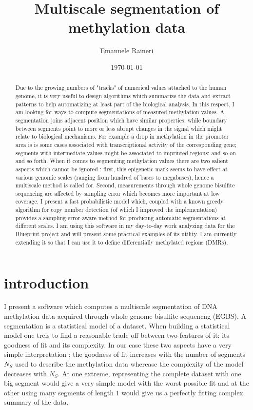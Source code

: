 \documentclass[11pt]{amsart}
\begin{document}
\title{Multiscale segmentation of methylation data}
\author{Emanuele Raineri}
\date{\today}
\maketitle

\begin{abstract}
Due to the growing numbers of "tracks" of numerical values attached to the human genome,
it is very useful to design algorithms which summarize the data
and extract patterns to help automatizing at least part of the
biological analysis. In this respect, I am looking for ways to compute 
segmentations of  measured methylation values. A segmentation joins adjacent position
which have similar properties, while boundary between segments point to more or less abrupt changes
in the signal which might relate to biological mechanisms. For example
a drop in methylation in the promoter area is is some cases associated with 
transcriptional activity of the corresponding gene; 
segments with intermediate values might be associated to imprinted regions; and so on and so forth.
When it comes to segmenting methylation values there are two salient aspects which cannot be ignored : first, this epigenetic mark seems to have effect at various genomic scales (ranging from hundred of bases to megabases), hence a multiscale method is called for. Second, measurements through whole genome bisulfite sequencing are affected by sampling error which becomes more important at low coverage.
I present a fast probabilistic model which, coupled with a known greedy algorithm for copy number detection (of which I improved the implementation) provides a sampling-error-aware method for producing automatic segmentations at different scales.
I am using this software in my day-to-day work analyzing data for the Blueprint project and will present some practical examples of its utility. 
I am currently extending it so that I can use it to define differentially methylated regions (DMRs).
\end{abstract}

\section{introduction}

I present  a software which computes a multiscale segmentation of DNA methylation data acquired through whole genome bisulfite sequencng (EGBS).
A segmentation is a statistical model of a dataset. When building a statistical model one treis to find a reasonable trade off between two 
features of it: its goodness of fit and its complexity.
In our case these two aspects have a very simple interpretation : the goodness of fit increases with the number of segments $N_S$ used to describe the 
methylation data wherease the complexity of the model decreases with $N_S$.  
At one extreme, representing the complete dataset with one big segment would give a very simple model with the worst possible fit and 
at the other using many segments of length $1$ would give us a perfectly fitting complex summary of the data.
\end{document}
